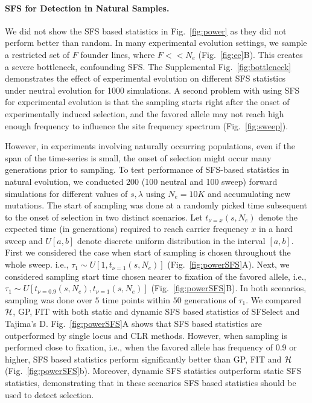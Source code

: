\documentclass[11pt]{article}
\begin{document}
\paragraph{SFS for Detection in Natural Samples.} We did not show the
SFS based statistics in Fig.~\ref{fig:power} as they did not perform
better than random. In many experimental evolution settings, we sample
a restricted set of $F$ founder lines, where $F<<N_e$
(Fig.~\ref{fig:ee}B). This creates a severe bottleneck, confounding
SFS. The Supplemental Fig.~\ref{fig:bottleneck} demonstrates the
effect of experimental evolution on different SFS statistics under
neutral evolution for 1000 simulations. A second problem with using SFS for 
experimental evolution
is that the sampling starts right after the onset of experimentally
induced selection, and the favored allele may not reach high enough
frequency to influence the site frequency spectrum
(Fig.~\ref{fig:sweep}).

However, in experiments involving naturally occurring populations,
even if the span of the time-series is small, the onset of selection
might occur many generations prior to sampling. To test performance of
SFS-based statistics in natural evolution, we conducted 200 (100
neutral and 100 sweep) forward simulations for different values of
$s,\lambda$ using $N_e=10K$ and accumulating new mutations. The start
of sampling was done at a randomly picked time subsequent to the onset
of selection in two distinct scenarios. Let $t_{\nu=x}(s,N_e)$ denote
the expected time (in generations) required to reach carrier frequency
$x$ in a hard sweep and $U[a,b]$ denote discrete uniform distribution
in the interval $[a,b]$. First we considered the case when start of
sampling is chosen throughout the whole sweep. i.e., $\tau_1 \sim
U\left[1,t_{\nu=1}(s,N_e)\right]$
(Fig.~\ref{fig:powerSFS}A). Next, we considered sampling start time
  chosen nearer to fixation of the favored allele, i.e., $\tau_1 \sim
  U\left[t_{\nu=0.9}(s,N_e),t_{\nu=1}(s,N_e)\right]$
  (Fig.~\ref{fig:powerSFS}B). In both scenarios, sampling was done
  over $5$ time points within $50$ generations of $\tau_1$. We
  compared ${\cal H}$, GP, FIT with both static and dynamic SFS based
  statistics of SFSelect and Tajima's D. Fig.~\ref{fig:powerSFS}A
  shows that SFS based statistics are outperformed by single locus and
  CLR methods. However, when sampling is performed close to fixation,
  i.e., when the favored allele has frequency of 0.9 or higher, SFS
  based statistics perform significantly better than GP, FIT and ${\cal H}$
  (Fig.~\ref{fig:powerSFS}b). Moreover, dynamic SFS statistics
  outperform static SFS statistics, demonstrating that in these
  scenarios SFS based statistics should be used to detect selection.
\end{document}
